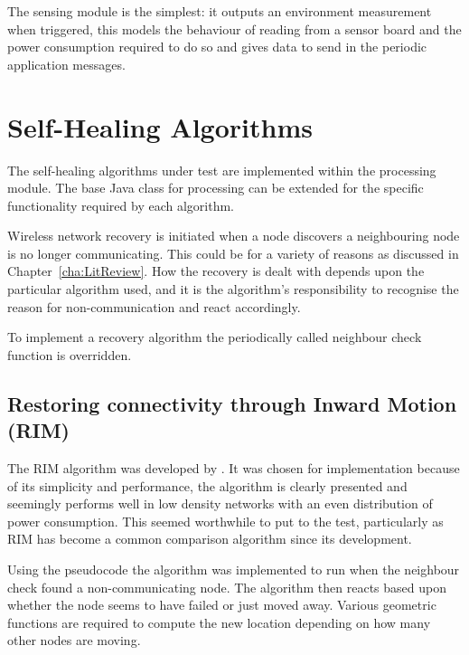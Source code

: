 \documentclass[authoryearcitations]{UoYCSproject}
\begin{document}
The sensing module is the simplest: it outputs an environment measurement when triggered, this models the behaviour of reading from a sensor board and the power consumption required to do so and gives data to send in the periodic application messages.

\section{Self-Healing Algorithms}

The self-healing algorithms under test are implemented within the processing module. The base Java class for processing can be extended for the specific functionality required by each algorithm.

Wireless network recovery is initiated when a node discovers a neighbouring node is no longer communicating. This could be for a variety of reasons as discussed in Chapter~\ref{cha:LitReview}. How the recovery is dealt with depends upon the particular algorithm used, and it is the algorithm's responsibility to recognise the reason for non-communication and react accordingly.

To implement a recovery algorithm the periodically called neighbour check function is overridden.

\subsection{Restoring connectivity through Inward Motion (RIM)}

The RIM algorithm was developed by \citet*{Younis2010}. It was chosen for implementation because of its simplicity and performance, the algorithm is clearly presented and seemingly performs well in low density networks with an even distribution of power consumption. This seemed worthwhile to put to the test, particularly as RIM has become a common comparison algorithm since its development.

Using the pseudocode the algorithm was implemented to run when the neighbour check found a non-communicating node. The algorithm then reacts based upon whether the node seems to have failed or just moved away. Various geometric functions are required to compute the new location depending on how many other nodes are moving.
\end{document}
